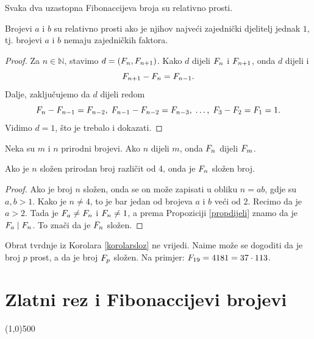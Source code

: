 \documentclass[14pt]{scrartcl}
\begin{document}
\begin{propozicija}
Svaka dva uzastopna Fibonaccijeva broja su relativno prosti.
\end{propozicija}
\begin{napomena}
Brojevi $a$ i $b$ su relativno prosti ako je njihov najve\'{c}i zajedni\v{c}ki djelitelj jednak $1$, tj. brojevi $a$ i $b$ nemaju zajedni\v{c}kih faktora.
\end{napomena}
\begin{proof}
Za $n\in\mathbb{N}$, stavimo $d=(F\sb{n},F\sb{n+1})$. Kako $d$ dijeli $F\sb{n}$ i $F\sb{n+1}$, onda $d$  dijeli i 
\begin{equation}
F\sb{n+1}-F\sb{n}=F\sb{n-1}.\notag
\end{equation}
Dalje, zaklju\v{c}ujemo da $d$ dijeli redom
\begin{equation}
F\sb{n}-F\sb{n-1}=F\sb{n-2},\; F\sb{n-1}-F\sb{n-2}=F\sb{n-3},\;\ldots,\; F\sb{3}-F\sb{2}=F\sb{1}=1.\notag
\end{equation}
Vidimo $d=1$, \v{s}to je trebalo i dokazati.
\end{proof}

\begin{propozicija}\label{propdijeli}
Neka su $m$ i $n$ prirodni brojevi. Ako $n$ dijeli $m$, onda $F\sb{n}$ dijeli $F\sb{m}$.
\end{propozicija}

\begin{korolar}\label{korolarsloz}
Ako je $n$ slo\v{z}en prirodan broj razli\v{c}it od 4, onda je $F\sb{n}$ slo\v{z}en broj.
\end{korolar}
\begin{proof}
Ako je broj $n$ slo\v{z}en, onda se on mo\v{z}e zapisati u obliku $n=ab$, gdje su $a,b>1$. Kako je $n \neq 4$, to je bar jedan od brojeva $a$ i $b$ ve\'{c}i od $2$. Recimo da je $a>2$. Tada je $F\sb{a} \neq F\sb{n}$ i $F\sb{n} \neq 1$, a prema Propoziciji \ref{propdijeli} znamo da je $F\sb{a} \mid F\sb{n}$. To zna\v{c}i da je $F\sb{n}$ slo\v{z}en.
\end{proof}

\begin{primjer}
Obrat tvrdnje iz Korolara \ref{korolarsloz} ne vrijedi.
Naime mo\v{z}e se dogoditi da je broj $p$ prost, a da je broj $F\sb{p}$ slo\v{z}en. Na primjer: $F\sb{19} = 4181 = 37 \cdot 113$.
\end{primjer}

\newpage
\section{Zlatni rez i Fibonaccijevi brojevi}
\line(1,0){500}
\vspace{10mm}
\end{document}
